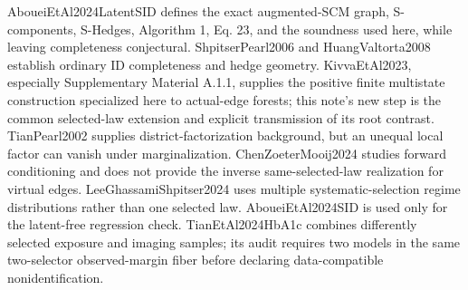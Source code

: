 AboueiEtAl2024LatentSID defines the exact augmented-SCM graph, S-components, S-Hedges, Algorithm 1, Eq. 23, and the soundness used here, while leaving completeness conjectural. ShpitserPearl2006 and HuangValtorta2008 establish ordinary ID completeness and hedge geometry. KivvaEtAl2023, especially Supplementary Material A.1.1, supplies the positive finite multistate construction specialized here to actual-edge forests; this note's new step is the common selected-law extension and explicit transmission of its root contrast. TianPearl2002 supplies district-factorization background, but an unequal local factor can vanish under marginalization. ChenZoeterMooij2024 studies forward conditioning and does not provide the inverse same-selected-law realization for virtual edges. LeeGhassamiShpitser2024 uses multiple systematic-selection regime distributions rather than one selected law. AboueiEtAl2024SID is used only for the latent-free regression check. TianEtAl2024HbA1c combines differently selected exposure and imaging samples; its audit requires two models in the same two-selector observed-margin fiber before declaring data-compatible nonidentification.